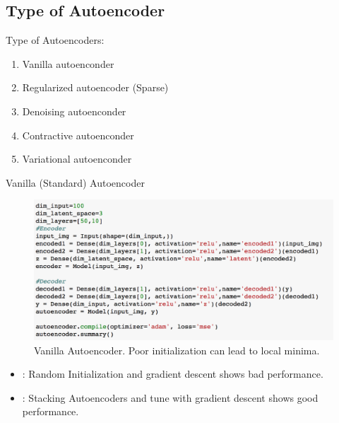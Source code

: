 \documentclass[xcolor=pdftex,dvipsnames,table,mathserif]{beamer}
\begin{document}

\subsection{Type of Autoencoder}
\begin{frame}{Type of Autoencoders:}
\begin{enumerate}
\item Vanilla autoenconder
\item Regularized autoencoder (Sparse)
\item Denoising autoenconder
\item Contractive autoenconder
\item Variational autoenconder
\end{enumerate}
\end{frame}

\begin{frame}{Vanilla (Standard) Autoencoder}
\begin{figure}
\includegraphics[width=.8\columnwidth]{../graphics/StandardAutoencoder}
\caption{Vanilla Autoencoder.  Poor initialization can lead to local minima.}
\end{figure}
\begin{itemize}
\item \cite{rumelhart1986learning}: Random Initialization and gradient descent shows bad performance.
\item \cite{bengio2007greedy} \cite{vincent2010stacked}: Stacking Autoencoders and tune with gradient descent shows good performance.
\end{itemize}
\end{frame}
\end{document}
